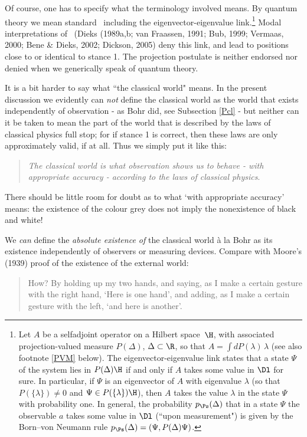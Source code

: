 \documentclass[12pt,titlepage]{article}
\newcommand{\Hs}{Hilbert space} \newcommand{\Bs}{Banach space}
\newcommand{\lm}{\lambda} \newcommand{\Lm}{\Lambda}
\begin{document}
Of course, one has to specify what the terminology involved means. By quantum theory we mean standard \qm\  including the eigenvector-eigenvalue link.\footnote{Let $A$ be a selfadjoint operator on a \Hs\ $\H$, with associated
projection-valued measure $P(\Delta)$, $\Delta\subset \R$, so that $A=\int dP(\lm)\, \lm$ (see also footnote  \ref{PVM} below). The eigenvector-eigenvalue link states that a state $\Psi$ of the system lies in $P(\Delta)\H$ if and only if $A$ takes some value in $\Dl$ for sure. In particular, if $\Psi$ is an eigenvector of $A$ with eigenvalue $\lm$ (so that $P(\{\lm\})\neq 0$ and $\Psi\in P(\{\lm\})\H$), then $A$ takes the value $\lm$ in the state $\Psi$ with probability one. In general, the probability $p_{\Ps}(\Delta)$ that
in a state $\Psi$ the observable $a$ takes some value in $\Dl$ (``upon measurement") is given by the Born--von Neumann  rule $p_{\Ps}(\Delta)=(\Psi, P(\Delta)\Psi)$.} 
Modal interpretations of \qm\ (Dieks (1989a,b; van Fraassen, 1991; Bub, 1999; Vermaas, 2000; Bene \& Dieks, 2002; Dickson, 2005) deny this link, and lead to positions  close to or identical to stance 1.
 The projection postulate is neither endorsed nor denied when we generically speak of quantum theory.

 It is a bit harder to say what ``the classical world" means. In the present discussion we evidently  can {\it not}  define the classical world as the world that exists independently of observation - as Bohr did, see Subsection \ref{Pcl} - but neither can it be taken to mean the
part of the world that is described by the laws of classical physics full stop; for if stance 1 is correct, then  these laws are only approximately valid, if at all. Thus we simply put it like this: 
\begin{quote}{\it The classical world is what observation shows us to behave - with appropriate accuracy - according to the laws of classical physics}.
\end{quote}
There should be little room for doubt as to what `with appropriate accuracy' means: the existence of the colour grey does not imply the nonexistence of black and white!

We {\it can} define the {\it absolute existence of}  the classical world \`{a} la Bohr as its existence  independently of observers or measuring devices. Compare with Moore's (1939)  proof of the existence of the external world:
\begin{quote} 
How? By holding up my two hands, and saying, as I make a certain gesture with the right hand, `Here is one hand', and adding, as I make a certain gesture with the left, `and here is another'.\end{quote}
\end{document}

